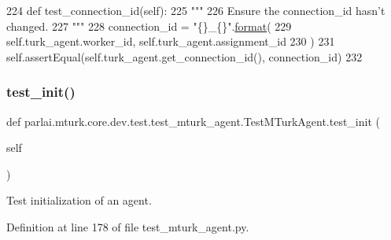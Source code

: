 \begin{DoxyCode}
224     \textcolor{keyword}{def }test\_connection\_id(self):
225         \textcolor{stringliteral}{"""}
226 \textcolor{stringliteral}{        Ensure the connection\_id hasn't changed.}
227 \textcolor{stringliteral}{        """}
228         connection\_id = \textcolor{stringliteral}{"\{\}\_\{\}"}.\hyperlink{namespaceparlai_1_1chat__service_1_1services_1_1messenger_1_1shared__utils_a32e2e2022b824fbaf80c747160b52a76}{format}(
229             self.turk\_agent.worker\_id, self.turk\_agent.assignment\_id
230         )
231         self.assertEqual(self.turk\_agent.get\_connection\_id(), connection\_id)
232 
\end{DoxyCode}
\mbox{\label{classparlai_1_1mturk_1_1core_1_1dev_1_1test_1_1test__mturk__agent_1_1TestMTurkAgent_a0ff58816506507267ff9084573c41934}} 
\subsubsection{\texorpdfstring{test\+\_\+init()}{test\_init()}}
{\footnotesize\ttfamily def parlai.\+mturk.\+core.\+dev.\+test.\+test\+\_\+mturk\+\_\+agent.\+Test\+M\+Turk\+Agent.\+test\+\_\+init (\begin{DoxyParamCaption}\item[{}]{self }\end{DoxyParamCaption})}

\begin{DoxyVerb}Test initialization of an agent.
\end{DoxyVerb}
 

Definition at line 178 of file test\+\_\+mturk\+\_\+agent.\+py.


